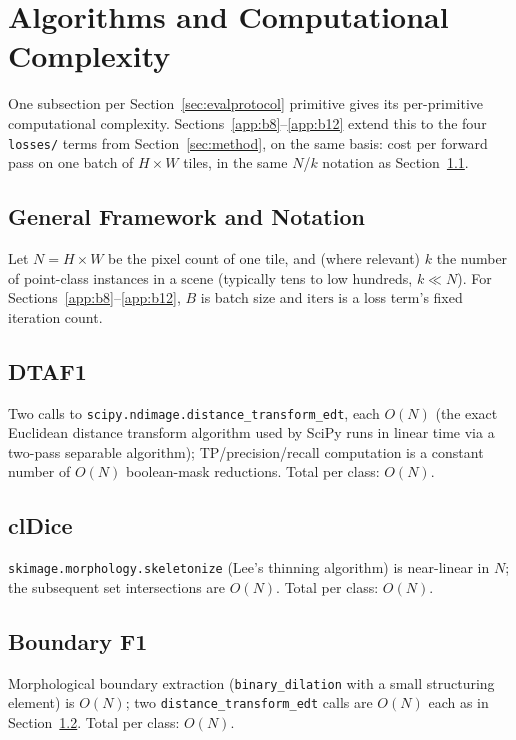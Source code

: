 \section{Algorithms and Computational Complexity}
\label{app:complexity}

One subsection per Section~\ref{sec:evalprotocol} primitive gives its per-primitive computational
complexity. Sections~\ref{app:b8}--\ref{app:b12} extend this to the four \texttt{losses/} terms
from Section~\ref{sec:method}, on the same basis: cost per forward pass on one batch of $H\times W$
tiles, in the same $N$/$k$ notation as Section~\ref{app:b1}.

\subsection{General Framework and Notation}
\label{app:b1}

Let $N=H\times W$ be the pixel count of one tile, and (where relevant) $k$ the number of
point-class instances in a scene (typically tens to low hundreds, $k \ll N$). For
Sections~\ref{app:b8}--\ref{app:b12}, $B$ is batch size and $\mathrm{iters}$ is a loss term's
fixed iteration count.

\subsection{DTAF1}
\label{app:b2}
Two calls to \texttt{scipy.ndimage.distance\_transform\_edt}, each $O(N)$ (the exact Euclidean
distance transform algorithm used by SciPy runs in linear time via a two-pass separable
algorithm); TP/precision/recall computation is a constant number of $O(N)$ boolean-mask
reductions. Total per class: $O(N)$.

\subsection{clDice}
\label{app:b3}
\texttt{skimage.morphology.skeletonize} (Lee's thinning algorithm) is near-linear in $N$; the
subsequent set intersections are $O(N)$. Total per class: $O(N)$.

\subsection{Boundary F1}
\label{app:b4}
Morphological boundary extraction (\texttt{binary\_dilation} with a small structuring element) is
$O(N)$; two \texttt{distance\_transform\_edt} calls are $O(N)$ each as in Section~\ref{app:b2}.
Total per class: $O(N)$.

